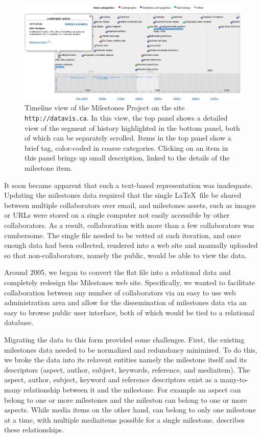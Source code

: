 \begin{figure}[!htb]
  \centering
  \includegraphics[width=\textwidth,clip]{fig/datavis-timeline2}
  \caption{Timeline view of the Milestones Project on the site \texttt{http://datavis.ca}. In this view,
  the top panel shows a detailed view of the segment of history highlighted in the bottom panel, both
  of which can be separately scrolled. Items in the top panel show a brief tag, color-coded in coarse
  categories. Clicking on an item in this panel brings up small description, linked to the details of
  the milestone item.
  }
  \label{fig:datavis-timeline2}
\end{figure}

It soon became apparent that such a text-based representation was inadequate. Updating the milestones data 
required that the single \LaTeX\ file be shared between multiple collaborators over email, and milestones 
assets, such as images or URLs were stored on a single computer not easily accessible by other collaborators.
As a result, collaboration with more than a few collaborators was cumbersome. The single file needed to be vetted 
at each iteration, and once enough data had been collected, rendered into a web site and manually uploaded so
that non-collaborators, namely the public, would be able to view the data.

Around 2005, we began to convert the flat file into a relational data and completely redesign the Milestones 
web site. Specifically, we wanted to facilitate collaboration between any number of collaborators via an easy
to use web administration area and allow for the dissemination of milestones data via an easy to browse public 
user interface, both of which would be tied to a relational database.

Migrating the data to this form provided some challenges. First, the existing milestones data needed to be
normalized and redundancy minimized. To do this, we broke the data into its relavent entities namely the 
milestone itself and its descriptors (aspect, author, subject, keywords, reference, and mediaitem).
The aspect, author, subject, keyword and reference descriptors exist as a many-to-many relationship between 
it and the milestone. For example an aspect can belong to one or more milestones and the mileston can belong to 
one or more aspects. While media items on the other hand, can belong to only one milestone at a time, with
multiple mediaitems possible for a single milestone.  describes these relationships.

